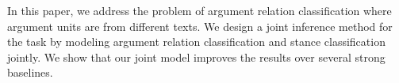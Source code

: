 In this paper, we address the problem of argument relation classification where argument units are from different texts. We design a joint inference method for the task by modeling argument relation classification and stance classification jointly. We show that our joint model improves the results over several strong baselines.
